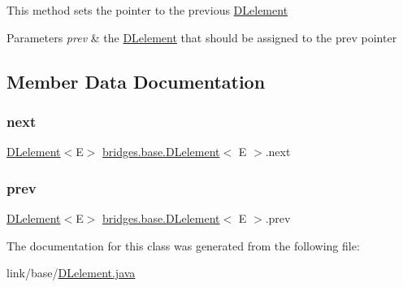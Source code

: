 This method sets the pointer to the previous \hyperlink{classbridges_1_1base_1_1_d_lelement}{D\+Lelement}


\begin{DoxyParams}{Parameters}
{\em prev} & the \hyperlink{classbridges_1_1base_1_1_d_lelement}{D\+Lelement} that should be assigned to the prev pointer \\
\hline
\end{DoxyParams}


\subsection{Member Data Documentation}
\hypertarget{classbridges_1_1base_1_1_d_lelement_ae2672f6718bf5e1758386d33e59d9340}{}\label{classbridges_1_1base_1_1_d_lelement_ae2672f6718bf5e1758386d33e59d9340} 
\subsubsection{\texorpdfstring{next}{next}}
{\footnotesize\ttfamily \hyperlink{classbridges_1_1base_1_1_d_lelement}{D\+Lelement}$<$E$>$ \hyperlink{classbridges_1_1base_1_1_d_lelement}{bridges.\+base.\+D\+Lelement}$<$ E $>$.next\hspace{0.3cm}{\ttfamily [protected]}}

\hypertarget{classbridges_1_1base_1_1_d_lelement_a6eba4876f820b75ac6bde01d7dea9da7}{}\label{classbridges_1_1base_1_1_d_lelement_a6eba4876f820b75ac6bde01d7dea9da7} 
\subsubsection{\texorpdfstring{prev}{prev}}
{\footnotesize\ttfamily \hyperlink{classbridges_1_1base_1_1_d_lelement}{D\+Lelement}$<$E$>$ \hyperlink{classbridges_1_1base_1_1_d_lelement}{bridges.\+base.\+D\+Lelement}$<$ E $>$.prev\hspace{0.3cm}{\ttfamily [protected]}}



The documentation for this class was generated from the following file\+:\begin{DoxyCompactItemize}
\item 
link/base/\hyperlink{_d_lelement_8java}{D\+Lelement.\+java}\end{DoxyCompactItemize}
